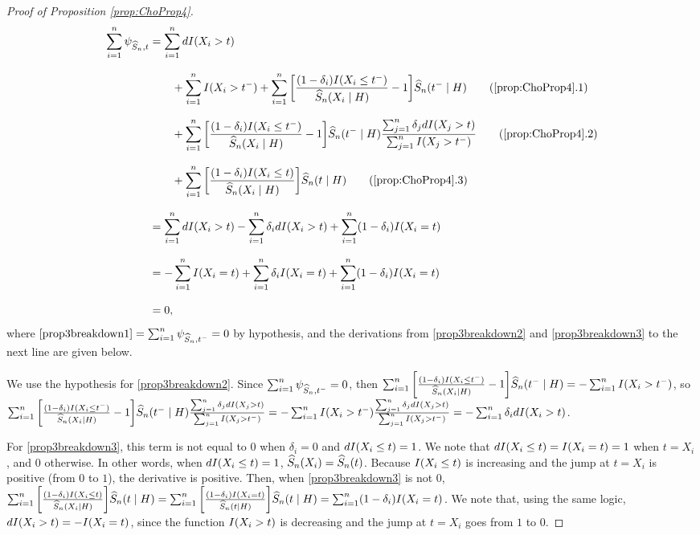 {\begin{proof}[Proof of Proposition \ref{prop:ChoProp4}]
\newcommand{\tone}{\sumotn d\xigt }
\newcommand{\ttwo}{\sumotn\delta_id\xigt
}
\newcommand{\xiet}{I(X_i=t)}
\newcommand{\tthree}{\sumotn\omdi\xiet}
\begin{align*}
\sumotn \estfunclabelSnhat &= 
\tone \eqnspace
&\quad \quad + \sumotn \xigtm 
+ \sumotn \bigg[ \frac{\omdi \xiletm}{\Snhat\argXigH}-1 \bigg] \Snhat\argtmgH \label{prop3breakdown1}\tag{\ref{prop:ChoProp4}.1} \eqnspace
&\quad \quad + \sumotn\bigg[ \frac{\omdi \xiletm}{\Snhat\argXigH} - 1 \bigg]  \Snhat\argtmgH \mkmfracj \label{prop3breakdown2}\tag{\ref{prop:ChoProp4}.2}
\eqnspace
&\quad \quad + \sumotn\bigg[  \frac{\omdi \xilet}{\Snhat\argXigH}\bigg] \Snhat\argtgH \label{prop3breakdown3}\tag{\ref{prop:ChoProp4}.3} \eqnspace
&= \tone - \ttwo + \tthree \eqnspace
&= -\sumotn\xiet + \sumotn \delta_i \xiet + \sumotn \omdi \xiet \eqnspace
&=0,
\end{align*}
where $\cref{prop3breakdown1} = \hypoth$ by hypothesis, and the derivations from \cref{prop3breakdown2} and \cref{prop3breakdown3} to the next line are given below.

We use the hypothesis for \cref{prop3breakdown2}. Since $\sum_{i=1}^n \psi_{\widehat{S}_n,t^-} = 0$, then $\sum_{i=1}^n\bigg[ \frac{(1-\delta_i) I(X_i \leq t^-)}{\widehat{S}_n(X_i\mid H)} - 1 \bigg]  \widehat{S}_n(t^-\mid H) = -\sum_{i=1}^nI(X_i > t^-)$, so $\sum_{i=1}^n\bigg[ \frac{(1-\delta_i) I(X_i \leq t^-)}{\widehat{S}_n(X_i\mid H)} - 1 \bigg]  \widehat{S}_n(t^-\mid H) \frac{\sum_{j=1}^n \delta_j dI(X_j>t)}{\sum_{j=1}^n I(X_j>t^-)} =  -\sum_{i=1}^nI(X_i > t^-) \frac{\sum_{j=1}^n \delta_j dI(X_j>t)}{\sum_{j=1}^n I(X_j>t^-)} = -\sum_{i=1}^n \delta_i dI(X_i > t)$.

For \cref{prop3breakdown3}, this term is not equal to $0$ when $\delta_i = 0$ and $dI(X_i \leq t) = 1$. We note that $d\xilet = \xiet = 1$ when $t = X_i$, and $0$ otherwise. In other words, when $dI(X_i \leq t) = 1$, $\widehat{S}_n(X_i) = \widehat{S}_n(t)$. Because $I(X_i \leq t)$ is increasing and the jump at $t=X_i$ is positive (from $0$ to $1$), the derivative is positive. Then, when \cref{prop3breakdown3} is not $0$, $\sumotn\bigg[  \frac{\omdi \xilet}{\Snhat\argXigH}\bigg] \Snhat\argtgH = \sumotn\bigg[  \frac{\omdi \xiet}{\Snhat\argtgH}\bigg] \Snhat\argtgH = \sumotn \omdi \xiet$. We note that, using the same logic, $d\xigt = -\xiet$, since the function $I(X_i > t)$ is decreasing and the jump at $t=X_i$ goes from $1$ to $0$.
\end{proof}
} %

%